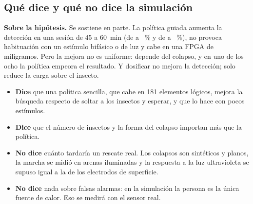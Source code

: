 \subsection{Qué dice y qué no dice la simulación}

\textbf{Sobre la hipótesis.} Se sostiene en parte. La política guiada aumenta la detección en una
sesión de 45 a 60~min (de \pPasivaCuarentaCinco{} a \pGuiadaCuarentaCinco~\% y de
\pPasivaSesenta{} a \pGuiadaSesenta~\%), no provoca habituación con un estímulo bifásico o de luz
y cabe en una FPGA de miligramos. Pero la mejora no es uniforme: depende del colapso, y en uno
de los ocho la política empeora el resultado. Y dosificar no mejora la detección; solo reduce la
carga sobre el insecto.

\begin{itemize}
  \item \textbf{Dice} que una política sencilla, que cabe en 181 elementos lógicos, mejora la búsqueda
        respecto de soltar a los insectos y esperar, y que lo hace con pocos estímulos.
  \item \textbf{Dice} que el número de insectos y la forma del colapso importan más que la política.
  \item \textbf{No dice} cuánto tardaría un rescate real. Los colapsos son sintéticos y planos, la marcha se
        midió en arenas iluminadas y la respuesta a la luz ultravioleta se supuso igual a la de los
        electrodos de superficie.
  \item \textbf{No dice} nada sobre falsas alarmas: en la simulación la persona es la única fuente de
        calor. Eso se medirá con el sensor real.
\end{itemize}
